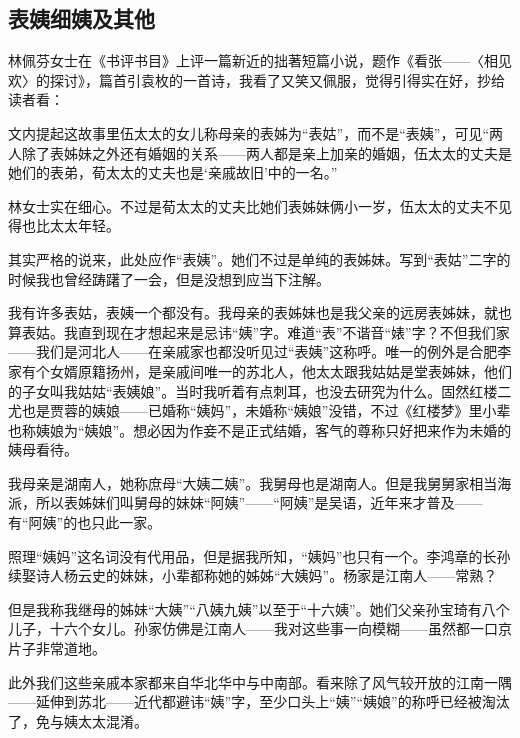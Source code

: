 \subsection{表姨细姨及其他}



\par 林佩芬女士在《书评书目》上评一篇新近的拙著短篇小说，题作《看张——〈相见欢〉的探讨》，篇首引袁枚的一首诗，我看了又笑又佩服，觉得引得实在好，抄给读者看：
\par 文内提起这故事里伍太太的女儿称母亲的表姊为“表姑”，而不是“表姨”，可见“两人除了表姊妹之外还有婚姻的关系——两人都是亲上加亲的婚姻，伍太太的丈夫是她们的表弟，荀太太的丈夫也是‘亲戚故旧’中的一名。”
\par 林女士实在细心。不过是荀太太的丈夫比她们表姊妹俩小一岁，伍太太的丈夫不见得也比太太年轻。
\par 其实严格的说来，此处应作“表姨”。她们不过是单纯的表姊妹。写到“表姑”二字的时候我也曾经踌躇了一会，但是没想到应当下注解。
\par 我有许多表姑，表姨一个都没有。我母亲的表姊妹也是我父亲的远房表姊妹，就也算表姑。我直到现在才想起来是忌讳“姨”字。难道“表”不谐音“婊”字？不但我们家——我们是河北人——在亲戚家也都没听见过“表姨”这称呼。唯一的例外是合肥李家有个女婿原籍扬州，是亲戚间唯一的苏北人，他太太跟我姑姑是堂表姊妹，他们的子女叫我姑姑“表姨娘”。当时我听着有点刺耳，也没去研究为什么。固然红楼二尤也是贾蓉的姨娘——已婚称“姨妈”，未婚称“姨娘”没错，不过《红楼梦》里小辈也称姨娘为“姨娘”。想必因为作妾不是正式结婚，客气的尊称只好把来作为未婚的姨母看待。
\par 我母亲是湖南人，她称庶母“大姨二姨”。我舅母也是湖南人。但是我舅舅家相当海派，所以表姊妹们叫舅母的妹妹“阿姨”——“阿姨”是吴语，近年来才普及——有“阿姨”的也只此一家。
\par 照理“姨妈”这名词没有代用品，但是据我所知，“姨妈”也只有一个。李鸿章的长孙续娶诗人杨云史的妹妹，小辈都称她的姊姊“大姨妈”。杨家是江南人——常熟？
\par 但是我称我继母的姊妹“大姨”“八姨九姨”以至于“十六姨”。她们父亲孙宝琦有八个儿子，十六个女儿。孙家仿佛是江南人——我对这些事一向模糊——虽然都一口京片子非常道地。
\par 此外我们这些亲戚本家都来自华北华中与中南部。看来除了风气较开放的江南一隅——延伸到苏北——近代都避讳“姨”字，至少口头上“姨”“姨娘”的称呼已经被淘汰了，免与姨太太混淆。
